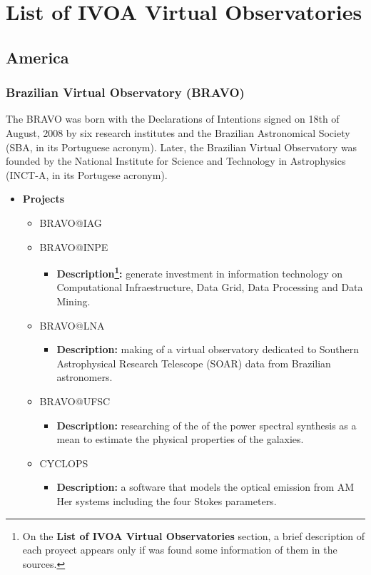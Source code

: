 \section{List of IVOA Virtual Observatories}
\subsection{America}
\subsubsection{Brazilian Virtual Observatory (BRAVO)}
The BRAVO \cite{website:bravo-home} was born with the Declarations of Intentions
signed on 18th of August, 2008 by six research institutes and the Brazilian
Astronomical Society (SBA, in its Portuguese acronym). Later, the Brazilian
Virtual Observatory was founded by the National Institute for Science and
Technology in Astrophysics (INCT-A, in its Portugese acronym).

\begin{itemize}
\item \textbf{Projects}
\begin{itemize}
\item BRAVO@IAG
\item BRAVO@INPE
\begin{itemize}
\item \textbf{Description\footnote{On the \textbf{List of IVOA Virtual
Observatories} section, a brief description of each proyect appears only if was
found some information of them in the sources.}:} generate investment in
information technology on Computational Infraestructure, Data Grid, Data
Processing and Data Mining.
\end{itemize}
\item BRAVO@LNA
\begin{itemize}
\item \textbf{Description:} making of a virtual observatory dedicated to
Southern Astrophysical Research Telescope (SOAR) data from Brazilian
astronomers.  
\end{itemize}
\item BRAVO@UFSC
\begin{itemize}
\item \textbf{Description:} researching of the of the power spectral synthesis
as a mean to estimate the physical properties of the galaxies.
\end{itemize}
\item CYCLOPS
\begin{itemize}
\item \textbf{Description:} a software that models the optical emission from AM
Her systems including the four Stokes parameters.
\end{itemize}
\end{itemize}
\end{itemize}


